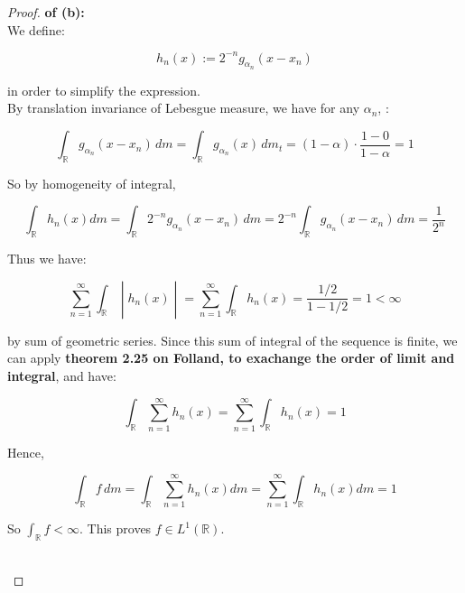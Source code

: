 \documentclass{qlnotes-export}
\begin{document}
\begin{proof}

\textbf{of (b):}\\
We define:

\[h_{n}(x) := 2^{- n}g_{\alpha_{n}}(x - x_{n})\]

in order to simplify the expression.\\
By translation invariance of Lebesgue measure, we have for any \(\alpha_{n}\), :

\[\int_{\mathbb{R}}g_{\alpha_{n}}(x - x_{n})\, dm = \int_{\mathbb{R}}g_{\alpha_{n}}(x)\, dm_{t} = (1 - \alpha) \cdot \frac{1 - 0}{1 - \alpha} = 1\]

So by homogeneity of integral,

\[\int_{\mathbb{R}}h_{n}(x) dm = \int_{\mathbb{R}}2^{- n}g_{\alpha_{n}}(x - x_{n})\, dm = 2^{- n}\int_{\mathbb{R}}g_{\alpha_{n}}(x - x_{n})\, dm = \frac{1}{2^{n}}\]

Thus we have:

\[\left. \sum\limits_{n = 1}^{\infty}\int_{\mathbb{R}} \middle| h_{n}(x) \middle| = \sum\limits_{n = 1}^{\infty}\int_{\mathbb{R}}h_{n}(x) = \frac{1/2}{1 - 1/2} = 1 < \infty \right.\]

by sum of geometric series. Since this sum of integral of the sequence is finite, we can apply \textbf{theorem 2.25 on Folland, to exachange the order of limit and integral}, and have:

\[\int_{\mathbb{R}}\sum\limits_{n = 1}^{\infty}h_{n}(x) = \sum\limits_{n = 1}^{\infty}\int_{\mathbb{R}}h_{n}(x) = 1\]

Hence,

\[\int_{\mathbb{R}}f\, dm = \int_{\mathbb{R}}\sum\limits_{n = 1}^{\infty}h_{n}(x)dm = \sum\limits_{n = 1}^{\infty}\int_{\mathbb{R}}h_{n}(x)dm = 1\]

So \(\int_{\mathbb{R}}f < \infty\). This proves \(f \in L^{1}({\mathbb{R}})\).\\
\strut \\

\end{proof}
\end{document}
